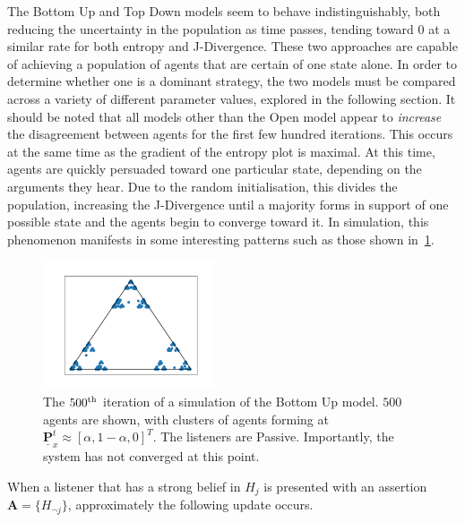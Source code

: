 The Bottom Up and Top Down models seem to behave indistinguishably, both reducing the uncertainty in the population as time passes, tending toward $0$ at a similar rate for both entropy and J-Divergence. These two approaches are capable of achieving a population of agents that are certain of one state alone. In order to determine whether one is a dominant strategy, the two models must be compared across a variety of different parameter values, explored in the following section.  It should be noted that all models other than the Open model appear to \emph{increase} the disagreement between agents for the first few hundred iterations. This occurs at the same time as the gradient of the entropy plot is maximal. At this time, agents are quickly persuaded toward one particular state, depending on the arguments they hear. Due to the random initialisation, this divides the population, increasing the J-Divergence until a majority forms in support of one possible state and the agents begin to converge toward it. In simulation, this phenomenon manifests in some interesting patterns such as those shown in~\cref{fig:sierpinski_triangle_intro}. 


\begin{figure}[H]
    \centering
    \includegraphics[width=0.45\textwidth]{Images/Figures/Barycenter/Serpinski_example.png}
    \caption{The $500^\textnormal{th}$ iteration of a simulation of the Bottom Up model. $500$ agents are shown, with clusters of agents forming at $\underline{\mathbf{P}}^t_{x} \approx [\alpha, 1-\alpha, 0]^T$. The listeners are Passive. Importantly, the system has not converged at this point.}
    \label{fig:sierpinski_triangle_intro}
\end{figure}

When a listener that has a strong belief in $H_j$ is presented with an assertion $ \mathbf{A} = \{ H_{¬j} \}$, approximately the following update occurs. 



